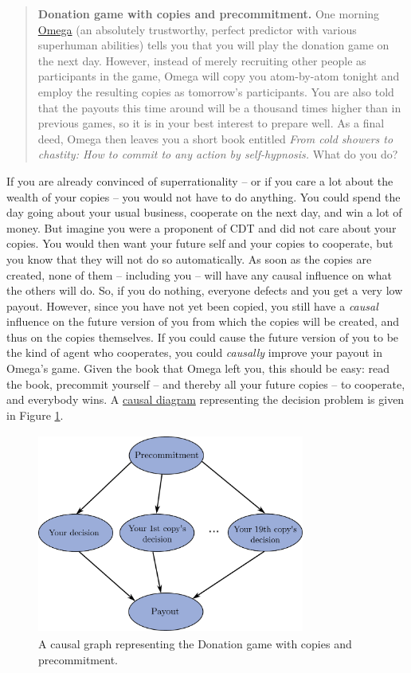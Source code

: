 \begin{quote}
\textbf{Donation game with copies and precommitment.} One morning
\href{https://wiki.lesswrong.com/wiki/Omega}{Omega} (an
absolutely trustworthy, perfect predictor with various superhuman
abilities) tells you that you will play the donation game on the next
day. However, instead of merely recruiting other people as participants
in the game, Omega will copy you atom-by-atom tonight and employ the
resulting copies as tomorrow's participants. You are also told that the
payouts this time around will be a thousand times higher than in
previous games, so it is in your best interest to prepare well. As a
final deed, Omega then leaves you a short book entitled \emph{From cold
showers to chastity: How to commit to any action by self-hypnosis.} What
do you do?
\end{quote}

If you are already convinced of superrationality -- or if you care a lot
about the wealth of your copies -- you would not have to do anything.
You could spend the day going about your usual business, cooperate on
the next day, and win a lot of money. But imagine you were a proponent
of CDT and did not care about your copies. You would then want your
future self and your copies to cooperate, but you know that they will
not do so automatically. As soon as the copies are created, none of them
-- including you -- will have any causal influence on what the others
will do. So, if you do nothing, everyone defects and you get a very low
payout. However, since you have not yet been copied, you still have a
\emph{causal} influence on the future version of you from which the
copies will be created, and thus on the copies themselves. If you could
cause the future version of you to be the kind of agent who cooperates,
you could \emph{causally} improve your payout in Omega's game. Given the
book that Omega left you, this should be easy: read the book, precommit
yourself -- and thereby all your future copies -- to cooperate, and
everybody wins. A
\href{https://en.wikipedia.org/wiki/Causal_model\#Causal_diagram}{causal
diagram} representing the decision problem is given in Figure
\ref{precommitment-causal-graph}.

\begin{figure}[t!]
    \centering
    \includegraphics[width=3.46217in,height=2.59375in]{figs/precommitment-causal-graph}
    \caption{A causal graph representing the Donation game with copies and precommitment.}
    \label{precommitment-causal-graph}
\end{figure}


